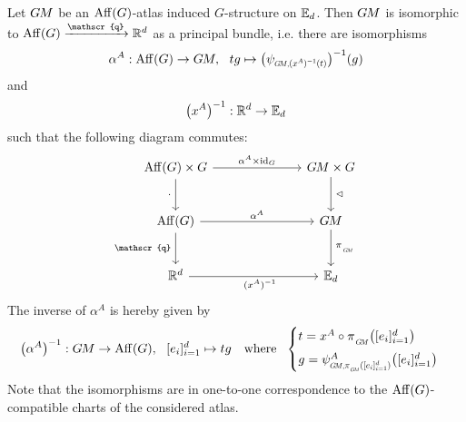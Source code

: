 \begin{thm}
\label{thm:}
    Let $G\mkern-1.4muM$ be an $\operatorname{Aff}(G)$-atlas induced $G$-structure on $\mathbb{E}_d$.
    Then $G\mkern-1.4muM$ is isomorphic to $\Aff(G) \xrightarrow{\mathscr{q}} \R^d$ as a principal bundle, i.e. there are isomorphisms
    \begin{align}\label{eq:principal_bundle_iso_AffG_GM}
        \alpha^A: \Aff(G) \to \GM,\ \ tg \mapsto \big( \psiGMxAinvt \big)^{-1}(g)
    \end{align}
    and
    \begin{align}
        \big( x^A \big)^{-1}: \mathbb{R}^d \to \mathbb{E}_d
    \end{align}
    such that the following diagram commutes:
    \begin{equation}\label{cd:GM_def_embedding}
    \begin{tikzcd}[row sep=2.5em, column sep=7.em]
        \Aff(G) \times G
            \arrow[r, "\alpha^A \times \id_G"]
            \arrow[d, "\cdot\,"']
        & \GM \times G
            \arrow[d, "\,\lhd"]
        \\
        \Aff(G)
            \arrow[r, pos=.5, "\alpha^A"]
            \arrow[d, "\mathscr{q}\,"']
        & \GM
            \arrow[d, "\,\piGM"]
        \\
        \R^d
            \arrow[r, pos=.55, "(x^A)^{-1}"']
        & \Euc_d
    \end{tikzcd}
    \end{equation}
    The inverse of $\alpha^A$ is hereby given by
    \begin{align}
        \big(\alpha^A \big)^{-1}: \GM \to \Aff(G),\ \ [e_i]_{i=1}^d \mapsto tg
        \quad \textup{where}\ \ 
        \begin{cases}
            t = x^A \circ \piGM \big( [e_i]_{i=1}^d \big) \\[1ex]
            g = \psi_{\protect\scalebox{.6}{$G\!M,$}\protect\scalebox{.7}{$\piGM([e_i]_{i=1}^d)$}}^A \big( [e_i]_{i=1}^d \big)
        \end{cases}
    \end{align}
    Note that the isomorphisms are in one-to-one correspondence to the $\operatorname{Aff}(G)$-compatible charts of the considered atlas.
\end{thm}
